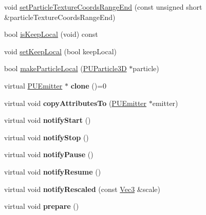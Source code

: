 \begin{DoxyCompactItemize}
\item 
void \hyperlink{classPUEmitter_adedd188e230448e37af079e08833d23e}{set\+Particle\+Texture\+Coords\+Range\+End} (const unsigned short \&particle\+Texture\+Coords\+Range\+End)
\item 
bool \hyperlink{classPUEmitter_a6562e7de28fec95a73a66e7d1e59cc57}{is\+Keep\+Local} (void) const
\item 
void \hyperlink{classPUEmitter_ad53330b258cf796c7e0000089cb1a6fa}{set\+Keep\+Local} (bool keep\+Local)
\item 
bool \hyperlink{classPUEmitter_a100dc4d1701077246a469bf30f0b483f}{make\+Particle\+Local} (\hyperlink{structPUParticle3D}{P\+U\+Particle3D} $\ast$particle)
\item 
\mbox{\label{classPUEmitter_aad71994880c0fdd33a2f6e892026347c}} 
virtual \hyperlink{classPUEmitter}{P\+U\+Emitter} $\ast$ {\bfseries clone} ()=0
\item 
\mbox{\label{classPUEmitter_a4cf1b22fafc633e9c49e23015795d5a9}} 
virtual void {\bfseries copy\+Attributes\+To} (\hyperlink{classPUEmitter}{P\+U\+Emitter} $\ast$emitter)
\item 
\mbox{\label{classPUEmitter_a6b3d2b95b6936d55dc0dd086ffe729ab}} 
virtual void {\bfseries notify\+Start} ()
\item 
\mbox{\label{classPUEmitter_a02467e489f3c0030a911b3b0371ebf2d}} 
virtual void {\bfseries notify\+Stop} ()
\item 
\mbox{\label{classPUEmitter_a0f8cde2a03610afcfe5e9ea5dfaa55c0}} 
virtual void {\bfseries notify\+Pause} ()
\item 
\mbox{\label{classPUEmitter_aafbaa061e0504a785632dcd16eaa93f5}} 
virtual void {\bfseries notify\+Resume} ()
\item 
\mbox{\label{classPUEmitter_a6752ce99030c5d32f0be728c780260f2}} 
virtual void {\bfseries notify\+Rescaled} (const \hyperlink{classVec3}{Vec3} \&scale)
\item 
\mbox{\label{classPUEmitter_aba49d266a81861e10b3f92d0fb50174a}} 
virtual void {\bfseries prepare} ()
\item 

\end{DoxyCompactItemize}
